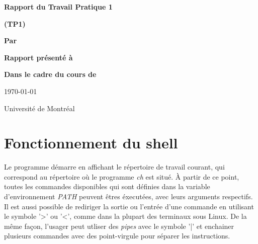 \documentclass[letterpaper,12pt]{scrartcl}
\begin{document}
	\begin{center}
		\vspace{2cm}

		{\Huge\bf\sf Rapport du Travail Pratique 1}

		\vspace{0.5cm}

		{\bf\sf (TP1)}

		\vspace{4cm}

		{\bf\sf Par}

		\vspace{0.5cm}{\large\bf\sf Charles Langlois et François Poitras}

		\vspace{2cm}

		{\bf\sf Rapport présenté à}

		\vspace{0.5cm}{\large\bf\sf M. Stefan Monnier}

		\vspace{2cm}

		{\bf\sf Dans le cadre du cours de}

		\vspace{0.5cm}{\large\bf\sf Systèmes d'exploitation (IFT2245)}

		\vspace{\fill}
		\today

		\vspace{0.5cm}Université de Montréal
	\end{center}
	
	\newpage

	\pagestyle{cb}
	
	\tableofcontents

	\newpage

	\section{Fonctionnement du shell}
			Le programme démarre en affichant le répertoire de travail courant, qui correspond au répertoire où le programme \textit{ch} est situé. À partir de ce point, toutes les commandes disponibles qui sont définies dans la variable d'environnement \textit{PATH} peuvent êtres éxecutées, avec leurs arguments respectifs. Il est aussi possible de rediriger la sortie ou l'entrée d'une commande en utilisant le symbole '>' ou '<', comme dans la plupart des terminaux sous Linux. De la même façon, l'usager peut utliser des \textit{pipes} avec le symbole '|' et enchainer plusieurs commandes avec des point-virgule pour séparer les instructions.
\end{document}
